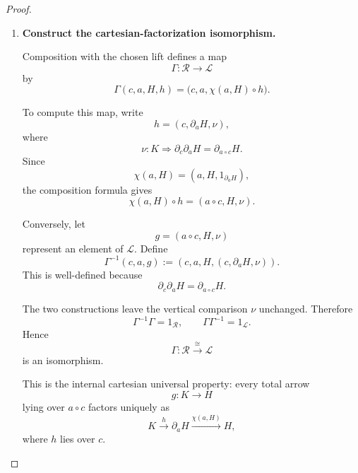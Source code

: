 \begin{proof}
\begin{enumerate}
        Define
        \[
            \mathcal R
            :=
            Y
            \times_{\vartheta,\,
                    \mathbf{Beh}_0
                    \times_{A_0}A_1,\,
                    (t_{\mathrm{tot}},
                     p_{\mathbf{Beh},1}^{\mathrm{tot}})}
            \mathbf{Beh}^{\mathrm{tot}}_1.
        \]
        A generalized element of \(\mathcal R\) is a quadruple
        \[
            (c,a,H,h),
        \]
        where
        \[
            h:K\to\partial_aH
        \]
        is a total arrow lying over \(c\).

        \item \textbf{Construct the cartesian-factorization isomorphism.}

        Composition with the chosen lift defines a map
        \[
            \Gamma:
            \mathcal R\to\mathcal L
        \]
        by
        \[
            \Gamma(c,a,H,h)
            =
            \bigl(
                c,a,
                \chi(a,H)\circ h
            \bigr).
        \]

        To compute this map, write
        \[
            h=(c,\partial_aH,\nu),
        \]
        where
        \[
            \nu:
            K\Rightarrow
            \partial_c\partial_aH
            =
            \partial_{a\circ c}H.
        \]
        Since
        \[
            \chi(a,H)
            =
            (a,H,1_{\partial_aH}),
        \]
        the composition formula gives
        \[
            \chi(a,H)\circ h
            =
            (a\circ c,H,\nu).
        \]

        Conversely, let
        \[
            g=(a\circ c,H,\nu)
        \]
        represent an element of \(\mathcal L\). Define
        \[
            \Gamma^{-1}(c,a,g)
            :=
            \left(
                c,a,H,
                (c,\partial_aH,\nu)
            \right).
        \]
        This is well-defined because
        \[
            \partial_c\partial_aH
            =
            \partial_{a\circ c}H.
        \]

        The two constructions leave the vertical comparison \(\nu\)
        unchanged. Therefore
        \[
            \Gamma^{-1}\Gamma=1_{\mathcal R},
            \qquad
            \Gamma\Gamma^{-1}=1_{\mathcal L}.
        \]
        Hence
        \[
            \Gamma:\mathcal R\overset{\cong}{\longrightarrow}\mathcal L
        \]
        is an isomorphism.

        This is the internal cartesian universal property: every total arrow
        \[
            g:K\to H
        \]
        lying over \(a\circ c\) factors uniquely as
        \[
            K
            \xrightarrow{h}
            \partial_aH
            \xrightarrow{\chi(a,H)}
            H,
        \]
        where \(h\) lies over \(c\).


\end{enumerate}
\end{proof}
